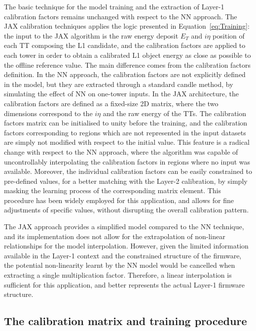 The basic technique for the model training and the extraction of Layer-1 calibration factors remains unchanged with respect to the NN approach. The JAX calibration techniques applies the logic presented in Equation~\ref{eq:Training}: the input to the JAX algorithm is the raw energy deposit $E_T$ and $i\eta$ position of each TT composing the L1 candidate, and the calibration factors are applied to each tower in order to obtain a calibrated L1 object energy as close as possible to the offline reference value. 
The main difference comes from the calibration factors definition. In the NN approach, the calibration factors are not explicitly defined in the model, but they are extracted through a standard candle method, by simulating the effect of NN on one-tower inputs. In the JAX architecture, the calibration factors are defined as a fixed-size 2D matrix, where the two dimensions correspond to the $i\eta$ and the raw energy of the TTs.
The calibration factors matrix can be initialised to unity before the training, and the calibration factors corresponding to regions which are not represented in the input datasets are simply not modified with respect to the initial value. This feature is a radical change with respect to the NN approach, where the algorithm was capable of uncontrollably interpolating the calibration factors in regions where no input was available.
Moreover, the individual calibration factors can be easily constrained to pre-defined values, for a better matching with the Layer-2 calibration, by simply masking the learning process of the corresponding matrix element. This procedure has been widely employed for this application, and allows for fine adjustments of specific values, without disrupting the overall calibration pattern. 

The JAX approach provides a simplified model compared to the NN technique, and its implementation does not allow for the extrapolation of non-linear relationships for the model interpolation. However, given the limited information available in the Layer-1 context and the constrained structure of the firmware, the potential non-linearity learnt by the NN model would be cancelled when extracting a single multiplication factor. Therefore, a linear interpolation is sufficient for this application, and better represents the actual Layer-1 firmware structure.

\subsection{The calibration matrix and training procedure}

